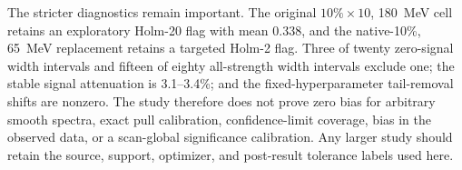 The stricter diagnostics remain important.  The original $10\%\times10$, 180~MeV
cell retains an exploratory Holm-20 flag with mean 0.338, and the native-10\%, 65~MeV
replacement retains a targeted Holm-2 flag.  Three of twenty zero-signal width intervals
and fifteen of eighty all-strength width intervals exclude one; the stable signal
attenuation is 3.1--3.4\%; and the fixed-hyperparameter tail-removal shifts are nonzero.
The study therefore does not prove zero bias for arbitrary smooth spectra, exact pull
calibration, confidence-limit coverage, bias in the observed data, or a scan-global
significance calibration.  Any larger study should retain the source, support,
optimizer, and post-result tolerance labels used here.
